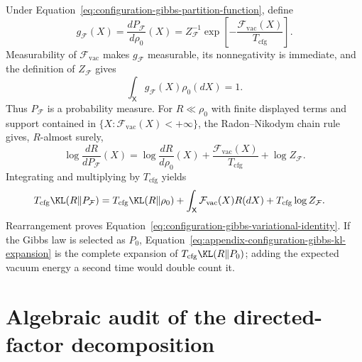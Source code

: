Under Equation~\eqref{eq:configuration-gibbs-partition-function}, define
\begin{equation}
g_{\mathcal F}(X)
=\frac{dP_{\mathcal F}}{d\rho_0}(X)
=Z_{\mathcal F}^{-1}
\exp\left[-\frac{\mathcal F_{\mathrm{vac}}(X)}
{T_{\mathrm{cfg}}}\right].
\label{eq:appendix-configuration-gibbs-density}
\end{equation}
Measurability of \(\mathcal F_{\mathrm{vac}}\) makes \(g_{\mathcal F}\) measurable, its nonnegativity is immediate, and the definition of \(Z_{\mathcal F}\) gives
\begin{equation}
\int_{\mathsf X}g_{\mathcal F}(X)\rho_0(dX)=1.
\label{eq:appendix-configuration-gibbs-normalization}
\end{equation}
Thus \(P_{\mathcal F}\) is a probability measure. For \(R\ll\rho_0\) with finite displayed terms and support contained in \(\{X:\mathcal F_{\mathrm{vac}}(X)<+\infty\}\), the Radon--Nikodym chain rule gives, \(R\)-almost surely,
\begin{equation}
\log\frac{dR}{dP_{\mathcal F}}(X)
=\log\frac{dR}{d\rho_0}(X)
+\frac{\mathcal F_{\mathrm{vac}}(X)}{T_{\mathrm{cfg}}}
+\log Z_{\mathcal F}.
\label{eq:appendix-configuration-gibbs-log-ratio}
\end{equation}
Integrating and multiplying by \(T_{\mathrm{cfg}}\) yields
\begin{align}
T_{\mathrm{cfg}}\KL(R\Vert P_{\mathcal F})
={}&T_{\mathrm{cfg}}\KL(R\Vert\rho_0)
+\int_{\mathsf X}\mathcal F_{\mathrm{vac}}(X)R(dX)
+T_{\mathrm{cfg}}\log Z_{\mathcal F}.
\label{eq:appendix-configuration-gibbs-kl-expansion}
\end{align}
Rearrangement proves Equation~\eqref{eq:configuration-gibbs-variational-identity}. If the Gibbs law is selected as \(P_0\), Equation~\eqref{eq:appendix-configuration-gibbs-kl-expansion} is the complete expansion of \(T_{\mathrm{cfg}}\KL(R\Vert P_0)\); adding the expected vacuum energy a second time would double count it.

\section{Algebraic audit of the directed-factor decomposition}
\label{sec:state-elbo-factor-audit}

